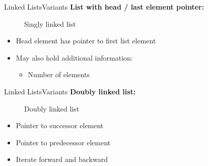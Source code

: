 \begin{frame}{Linked Lists}{Variants}
  \textbf{List with head / last element pointer:}
  \begin{figure}
    
    \caption{Singly linked list}
    \label{fig:linked_list:variation:singly_linked_list_with_head}
  \end{figure}
  \begin{itemize}
    \item<3->
      Head element has pointer to first list element
    \item<4->
      May also hold additional information:
      \begin{itemize}
        \item<5->
          Number of elements
      \end{itemize}
  \end{itemize}
\end{frame}


\begin{frame}{Linked Lists}{Variants}
  \textbf{Doubly linked list:}
    \begin{figure}
    
    \caption{Doubly linked list}
    \label{fig:linked_list:variation:doubly_linked_list}
  \end{figure}
  \begin{itemize}
    \item<3->
      Pointer to successor element
    \item<4->
      Pointer to predecessor element
    \item<5->
      Iterate forward and backward
  \end{itemize}
\end{frame}



